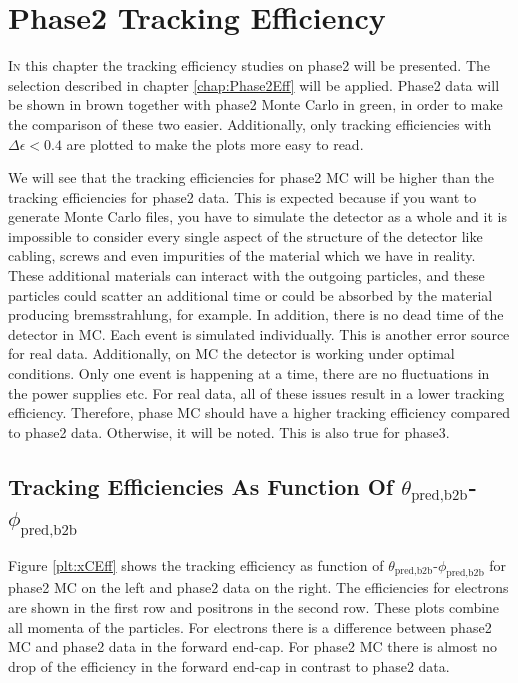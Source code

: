 \documentclass[a4paper,11pt,twosided,final,german,openbib,pdftex,listof=totoc,bibliography=totoc]{scrbook}
\begin{document}
\chapter{Phase2 Tracking Efficiency}
\label{chp:TrackingEfficiencyPhase2}



\lettrine{I}{n} this chapter the tracking efficiency studies on phase2 will be presented. The selection described in chapter \ref{chap:Phase2Eff} will be applied. Phase2 data will be shown in brown together with phase2 Monte Carlo in green, in order to make the comparison of these two easier. Additionally, only tracking efficiencies with $\Delta \epsilon < 0.4$ are plotted to make the plots more easy to read. 
\newline
 
We will see that the tracking efficiencies for phase2 MC will be higher than the tracking efficiencies for phase2 data. This is expected because if you want to generate Monte Carlo files, you have to simulate the detector as a whole and it is impossible to consider every single aspect of the structure of the detector like cabling, screws and even impurities of the material which we have in reality. These additional materials can interact with the outgoing particles, and these particles could scatter an additional time or could be absorbed by the material producing bremsstrahlung, for example. In addition, there is no dead time of the detector in MC. Each event is simulated individually. This is another error source for real data. Additionally, on MC the detector is working under optimal conditions. Only one event is happening at a time, there are no fluctuations in the power supplies etc.
For real data, all of these issues result in a lower tracking efficiency. Therefore, phase MC should have a higher tracking efficiency compared to phase2 data. Otherwise, it will be noted. This is also true for phase3.
 
\clearpage

\section{Tracking Efficiencies As Function Of $\theta_{\textrm{pred,b2b}}$-$\phi_{\textrm{pred,b2b}}$ }
\label{sec:tpEff}

Figure \ref{plt:xCEff} shows the tracking efficiency as function of $\theta_{\textrm{pred,b2b}}$-$\phi_{\textrm{pred,b2b}}$ for phase2 MC on the left and phase2 data on the right. The efficiencies for electrons are shown in the first row and positrons in the second row. These plots combine all momenta of the particles. For electrons there is a difference between phase2 MC and phase2 data in the forward end-cap. For phase2 MC there is almost no drop of the efficiency in the forward end-cap in contrast to phase2 data. 
\end{document}
